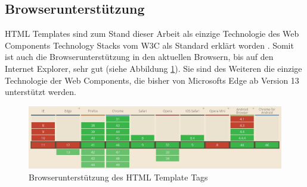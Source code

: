 \subsection{Browserunterstützung}\label{html-templates-browserunterstuetzung}

\ac{HTML} Templates sind zum Stand dieser Arbeit als einzige Technologie des Web Components Technology Stacks vom \ac{W3C} als Standard erklärt worden \cite{citeulike:13853159}. Somit ist auch die Browserunterstützung in den aktuellen Browsern, bis auf den Internet Explorer, sehr gut (siehe Abbildung \ref{fig:bdhtmltt}). Sie sind des Weiteren die einzige Technologie der Web Components, die bisher von Microsofts Edge ab Version 13 unterstützt werden.

\begin{figure}[htbp]
 \centering
 \includegraphics[width=\linewidth]{kapitel2/bilder/4-html-templates-browserunterstuetzung}
 \caption{Browserunterstützung des HTML Template Tags}
 \label{fig:bdhtmltt}
\end{figure}
